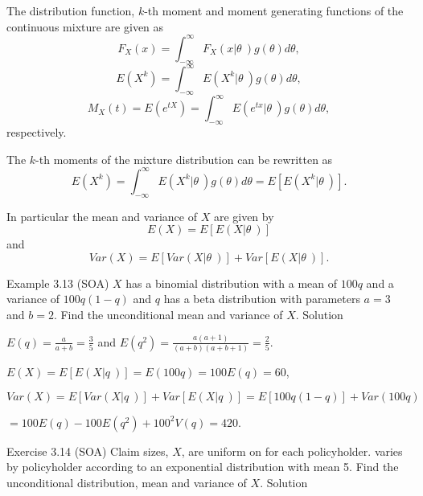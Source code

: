 \documentclass[]{book}
\theoremstyle{definition}
\theoremstyle{definition}
\theoremstyle{definition}
\theoremstyle{remark}
\begin{document}
The distribution function, \(k\)-th moment and moment generating
functions of the continuous mixture are given as
\[F_{X}\left( x \right) = \int_{-\infty}^{\infty}{F_{X}\left( x\left| \theta \right.\  \right)g\left( \theta \right)} d \theta,\]
\[E\left( X^{k} \right) = \int_{-\infty}^{\infty}{E\left( X^{k}\left| \theta \right.\  \right)g\left( \theta \right)}d \theta,\]
\[M_{X}\left( t \right) = E\left( e^{t X} \right) = \int_{-\infty}^{\infty}{E\left( e^{ tx}\left| \theta \right.\  \right)g\left( \theta \right)}d \theta, \]
respectively.

The \(k\)-th moments of the mixture distribution can be rewritten as
\[E\left( X^{k} \right) = \int_{-\infty}^{\infty}{E\left( X^{k}\left| \theta \right.\  \right)g\left( \theta \right)}d\theta = E\left\lbrack E\left( X^{k}\left| \theta \right.\  \right) \right\rbrack .\]

In particular the mean and variance of \(X\) are given by
\[E\left( X \right) = E\left\lbrack E\left( X\left| \theta \right.\  \right) \right\rbrack\]
and
\[Var\left( X \right) = E\left\lbrack Var\left( X\left| \theta \right.\  \right) \right\rbrack + Var\left\lbrack E\left( X\left| \theta \right.\  \right) \right\rbrack .\]

Example 3.13 (SOA) \(X\) has a binomial distribution with a mean of
\(100q\) and a variance of \(100q\left( 1 - q \right)\) and \(q\) has a
beta distribution with parameters \(a = 3\) and \(b = 2\). Find the
unconditional mean and variance of \(X\). Solution

\(E\left( q \right) = \frac{a}{a + b} = \frac{3}{5}\) and
\(E\left( q^{2} \right) = \frac{a\left( a + 1 \right)}{\left( a + b \right)\left( a + b + 1 \right)} = \frac{2}{5}\).

\(E\left( X \right) = E\left\lbrack E\left( X\left| q \right.\  \right) \right\rbrack = E\left( 100q \right) = 100E\left( q \right) = 60\),

\[Var\left( X \right) = E\left\lbrack Var\left( X\left| q \right.\  \right) \right\rbrack + Var\left\lbrack E\left( X\left| q \right.\  \right) \right\rbrack = E\left\lbrack 100q\left( 1 - q \right) \right\rbrack + Var\left( 100q \right)\]

\(= 100E\left( q \right) - 100E\left( q^{2} \right) + 100^{2}V\left( q \right) = 420\).

Exercise 3.14 (SOA) Claim sizes, \(X\), are uniform on for each
policyholder. varies by policyholder according to an exponential
distribution with mean 5. Find the unconditional distribution, mean and
variance of \(X\). Solution
\end{document}
